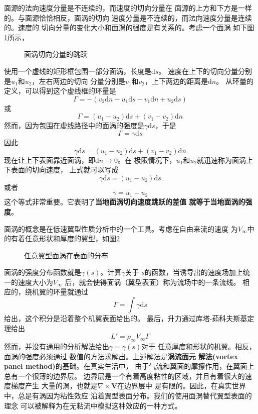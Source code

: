 面源的法向速度分量是不连续的，而速度的切向分量在
面源的上方和下方是一样的。与面源恰恰相反，面涡的切向
速度分量是不连续的，而法向速度分量是连续的。速度的
切向分量的变化大小和面涡的强度是有关系的。考虑一个面涡
如下图\ref{fig:strength_vortex}所示，
\begin{figure}[!ht]
  \centering
  
  \caption{面涡切向分量的跳跃}
  \label{fig:strength_vortex}
\end{figure}
使用一个虚线的矩形框包围一部分面涡，长度是$\mathrm{d}s $。
速度在上下的切向分量分别是$u_1$和$u_2$，左右两边的切向
分量分别是$v_1$和$v_2$，上下两边的距离是$\mathrm{d}n $。
从环量的定义，可以得到这个虚线框的环量是
\[
  \Gamma=-(v_2 \mathrm{d}n -u_1 \mathrm{d}s -v_1 \mathrm{d}n +u_2 \mathrm{d}s)
\]
或
\[
  \Gamma= (u_1-u_2) \mathrm{d}s+(v_1-v_2) \mathrm{d}n
\]
然而，因为包围在虚线路径中的面涡的强度是$\gamma \mathrm{d}s $，于是
\[
  \Gamma =\gamma \mathrm{d}s 
\]
因此
\[
  \gamma \mathrm{d} s =(u_1-u_2 )\mathrm{d}s+(v_1-v_2) \mathrm{d}n
\]
现在让上下表面靠近面涡，即$\mathrm{d}n \rightarrow 0$。在
极限情况下，$u_1$和$u_2$就迅速称为面涡上下表面的切向速度，
上式就可以写成
\[
  \gamma \mathrm{d}s =(u_1-u_2)\mathrm{d}s 
\]
或者
\[
  \gamma =u_1-u_2
\]
这个等式非常重要。它表明了{\bfseries \color{noteorange}当地面涡切向速度跳跃的差值
就等于当地面涡的强度}。

面涡的概念是在低速翼型性质分析中的一个工具。考虑在自由来流的速度
为$V_\infty$中的有着任意形状和厚度的翼型，如图\ref{fig:distributing}
\begin{figure}[!ht]
  \centering
  
  \caption{任意翼型面涡在表面的分布}
  \label{fig:distributing}
\end{figure}
面涡的强度分布函数就是$\gamma(s)$。计算$\gamma$关于
$s$的函数，当诱导出的速度场加上统一的速度大小为$V_\infty$
后，就会使得面涡（翼型表面）称为流场中的一条流线。
相应的，绕机翼的环量就通过
\[
  \Gamma= \int \gamma \mathrm{d}s 
\]
给出，这个积分是沿着整个机翼表面给出的。
最后，升力通过库塔-茹科夫斯基定理给出
\[
  L'=\rho _\infty V_\infty \Gamma
\]
然而，并没有通用的分析解法给出$\gamma=\gamma(s)$对于
任意厚度和形状的机翼。相反，面涡的强度必须通过
数值的方法求解出。上述解法是{\bfseries 涡流面元
解法(vortex panel method)}的基础。在真实生活中，
由于气流和翼面的摩擦作用，在翼面上总有一个很薄的边界层。
边界层是一个有着高度粘性的区域，并且有着很大的速度梯度产生
大量的涡，也就是$\nabla \times \mathbf{V}$在边界层中
是有限的。因此，在真实世界中，总是有涡因为粘性效应
沿着翼型表面分布。我们的使用面涡替代翼型表面的理念
可以被解释为在无粘流中模拟这种效应的一种方式。

